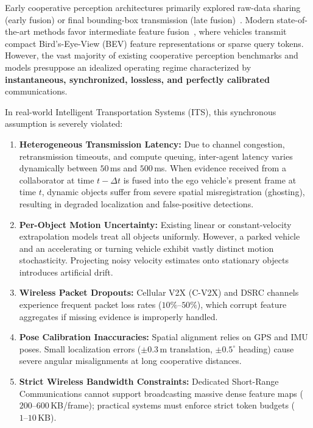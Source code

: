 \documentclass[10pt,journal,compsoc]{IEEEtran}
\begin{document}
Early cooperative perception architectures primarily explored raw-data sharing (early fusion) or final bounding-box transmission (late fusion)~\cite{cui2022coopreview}. Modern state-of-the-art methods favor intermediate feature fusion~\cite{chen2019fcooper, li2021disconet, xu2022v2xvit, hu2022where2comm, huang2023how2comm}, where vehicles transmit compact Bird's-Eye-View (BEV) feature representations or sparse query tokens. However, the vast majority of existing cooperative perception benchmarks and models presuppose an idealized operating regime characterized by \textbf{instantaneous, synchronized, lossless, and perfectly calibrated} communications.

In real-world Intelligent Transportation Systems (ITS), this synchronous assumption is severely violated:
\begin{enumerate}
    \item \textbf{Heterogeneous Transmission Latency:} Due to channel congestion, retransmission timeouts, and compute queuing, inter-agent latency varies dynamically between $50$\,ms and $500$\,ms. When evidence received from a collaborator at time $t - \Delta t$ is fused into the ego vehicle's present frame at time $t$, dynamic objects suffer from severe spatial misregistration (ghosting), resulting in degraded localization and false-positive detections.
    \item \textbf{Per-Object Motion Uncertainty:} Existing linear or constant-velocity extrapolation models treat all objects uniformly. However, a parked vehicle and an accelerating or turning vehicle exhibit vastly distinct motion stochasticity. Projecting noisy velocity estimates onto stationary objects introduces artificial drift.
    \item \textbf{Wireless Packet Dropouts:} Cellular V2X (C-V2X) and DSRC channels experience frequent packet loss rates ($10\%\text{--}50\%$), which corrupt feature aggregates if missing evidence is improperly handled.
    \item \textbf{Pose Calibration Inaccuracies:} Spatial alignment relies on GPS and IMU poses. Small localization errors ($\pm 0.3$\,m translation, $\pm 0.5^\circ$ heading) cause severe angular misalignments at long cooperative distances.
    \item \textbf{Strict Wireless Bandwidth Constraints:} Dedicated Short-Range Communications cannot support broadcasting massive dense feature maps ($200\text{--}600$\,KB/frame); practical systems must enforce strict token budgets ($1\text{--}10$\,KB).
\end{enumerate}
\end{document}
